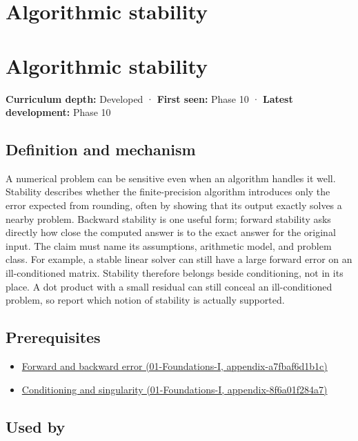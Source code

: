 \hypertarget{appendix-aa2bf0d79639}{}
\section*{Algorithmic stability}
\section{Algorithmic stability}\label{algorithmic-stability}

\textbf{Curriculum depth:} Developed · \textbf{First seen:} Phase 10 · \textbf{Latest development:} Phase 10

\subsection{Definition and mechanism}\label{definition-and-mechanism}

A numerical problem can be sensitive even when an algorithm handles it well. Stability describes whether the finite-precision algorithm introduces only the error expected from rounding, often by showing that its output exactly solves a nearby problem. Backward stability is one useful form; forward stability asks directly how close the computed answer is to the exact answer for the original input. The claim must name its assumptions, arithmetic model, and problem class. For example, a stable linear solver can still have a large forward error on an ill-conditioned matrix. Stability therefore belongs beside conditioning, not in its place. A dot product with a small residual can still conceal an ill-conditioned problem, so report which notion of stability is actually supported.

\subsection{Prerequisites}\label{prerequisites}

\begin{itemize}
\tightlist
\item
  \href{}{Forward and backward error (01-Foundations-I, appendix-a7fbaf6d1b1c)}
\item
  \href{}{Conditioning and singularity (01-Foundations-I, appendix-8f6a01f284a7)}
\end{itemize}

\subsection{Used by}\label{used-by}

